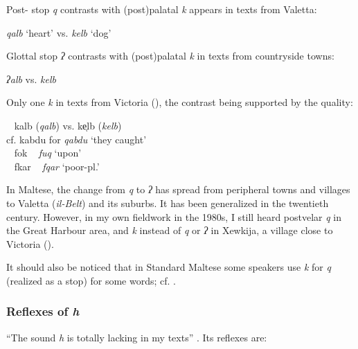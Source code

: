 \documentclass[output=paper]{langsci/langscibook}
\begin{document}
Post- stop \textit{q} contrasts with (post)palatal \textit{k} appears in texts from Valetta:

\ea%
\textit{qalb}  `heart'  vs.  \textit{kelb}  `dog'
\z


Glottal stop \textit{ʔ} contrasts with (post)palatal \textit{k} in texts from countryside towns:

\ea%
\textit{ʔalb}    vs.  \textit{kelb}  
\z


Only one \textit{k} in texts from Victoria (), the contrast being supported by the  quality: 

\ea%
\gllll ~    {kalb (\textit{qalb})}  vs.  {ke̜lb (\textit{kelb})}\\
     cf.  kabdu                  for  \textit{qabdu}  {‘they caught’}\\
    ~     fok                    ~     \textit{fuq}    ‘upon’\\
   ~        fkar                 ~       \textit{fqar}  ‘poor-pl.’\\
\z

In Maltese, the change from \textit{q} to \textit{ʔ} has spread from peripheral towns and villages to Valetta (\textit{il-Belt}) and its suburbs. It has been generalized in the twentieth century. However, in my own fieldwork in the 1980s, I still heard postvelar \textit{q} in the Great Harbour area, and \textit{k} instead of \textit{q} or \textit{ʔ} in Xewkija, a village close to Victoria ().


It should also be noticed that in Standard Maltese some speakers use \textit{k} for \textit{q} (realized as a  stop) for some words; cf. \citet[27]{Borg2011}.

\newpage 
\subsubsection{Reflexes of \textit{h}}

“The sound \textit{h} is totally lacking in my texts” \citet[78]{Stumme1904}. Its reflexes are:
\end{document}
